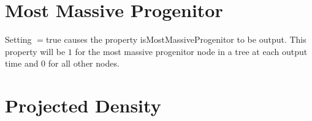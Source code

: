 \section{Most Massive Progenitor}

Setting {\normalfont \ttfamily [outputMostMassiveProgenitor]}$=${\normalfont \ttfamily true} causes the property {\normalfont \ttfamily isMostMassiveProgenitor} to be output. This property will be $1$ for the most massive progenitor node in a tree at each output time and $0$ for all other nodes.

\section{Projected Density}


